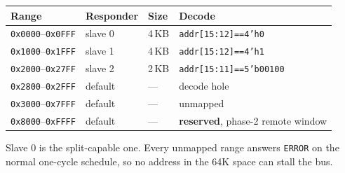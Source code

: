 \documentclass[11pt,a4paper]{article}
\newcommand{\sig}[1]{\texttt{#1}}
\begin{document}
\begin{table}[htb]
\centering\small
\begin{tabular}{@{}llll@{}}
\toprule
\textbf{Range} & \textbf{Responder} & \textbf{Size} & \textbf{Decode}\\
\midrule
\sig{0x0000}--\sig{0x0FFF} & slave 0 & 4\,KB & \sig{addr[15:12]==4'h0}\\
\sig{0x1000}--\sig{0x1FFF} & slave 1 & 4\,KB & \sig{addr[15:12]==4'h1}\\
\sig{0x2000}--\sig{0x27FF} & slave 2 & 2\,KB & \sig{addr[15:11]==5'b00100}\\
\sig{0x2800}--\sig{0x2FFF} & default & ---   & decode hole\\
\sig{0x3000}--\sig{0x7FFF} & default & ---   & unmapped\\
\sig{0x8000}--\sig{0xFFFF} & default & ---   & \textbf{reserved}, phase-2
                                               remote window\\
\bottomrule
\end{tabular}
\end{table}

Slave 0 is the split-capable one. Every unmapped range answers \sig{ERROR} on
the normal one-cycle schedule, so no address in the 64K space can stall the
bus.
\end{document}
